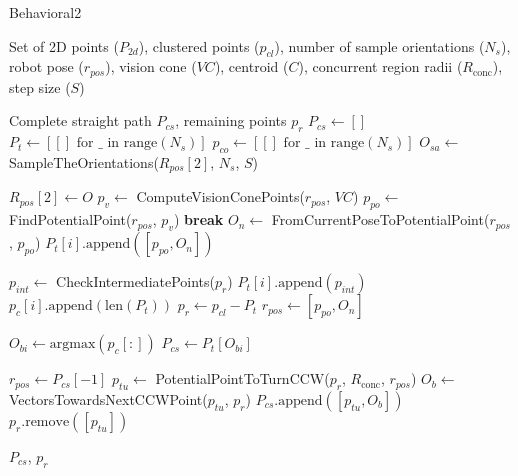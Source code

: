 \begin{algorithm}[H]
    \caption{Behavioral2}
    \label{alg:behavioral2}
    \begin{algorithmic}[1]

    \Require Set of 2D points ($P_{2d}$), clustered points ($p_{cl}$), number of sample orientations ($N_s$), robot pose ($r_{pos}$), vision cone ($VC$), centroid ($C$), concurrent region radii ($R_{\text{conc}}$), step size ($S$)

    \Ensure Complete straight path $P_{cs}$, remaining points $p_r$
    \State $P_{cs} \leftarrow []$
    \State $P_t \leftarrow [[] \text{ for } \_ \text{ in range}(N_s)]$
    \State $p_{co} \leftarrow [[] \text{ for } \_ \text{ in range}(N_s)]$
    \State $O_{sa} \leftarrow$ SampleTheOrientations($R_{pos}[2]$, $N_s$, $S$)
    
        \State $R_{pos}[2] \leftarrow O$
            \State $p_v \leftarrow$ ComputeVisionConePoints($r_{pos}$, $VC$)
            \State $p_{po} \leftarrow$ FindPotentialPoint($r_{pos}$, $p_v$)
                \State \textbf{break}
            \EndIf
            \State $O_n \leftarrow$ FromCurrentPoseToPotentialPoint($r_{pos}$, $p_{po}$)
            \State $P_t[i].\text{append}([p_{po}, O_n])$
            
            \State $p_{int} \leftarrow$ CheckIntermediatePoints($p_r$)
            \State $P_t[i].\text{append}(p_{int})$
            \State $p_c[i].\text{append}(\text{len}(P_t))$
            \State $p_r \leftarrow p_{cl} - P_t$
            \State $r_{pos} \leftarrow [p_{po}, O_n]$
        \EndWhile
    \EndFor
    
    \State $O_{bi} \leftarrow \text{argmax}(p_c[:])$
    \State $P_{cs} \leftarrow P_t[O_{bi}]$
    
    \State $r_{pos} \leftarrow P_{cs}[-1]$
    \State $p_{tu} \leftarrow$ PotentialPointToTurnCCW($p_r$, $R_{\text{conc}}$, $r_{pos}$)
    \State $O_b \leftarrow$ VectorsTowardsNextCCWPoint($p_{tu}$, $p_r$)
    \State $P_{cs}.\text{append}([p_{tu}, O_b])$
    \State $p_r.\text{remove}([p_{tu}])$

    \State \Return $P_{cs}$, $p_r$
    \end{algorithmic}
    \end{algorithm}
    

    



